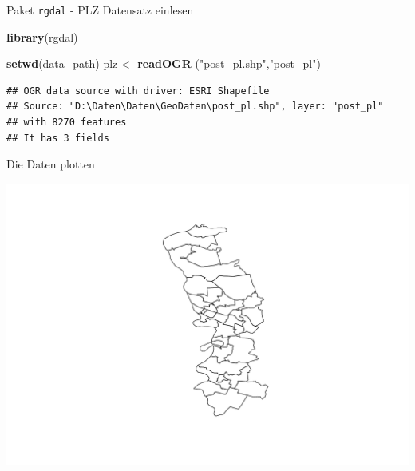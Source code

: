 \documentclass[ignorenonframetext,]{beamer}
\newenvironment{Shaded}{\begin{snugshade}}{\end{snugshade}}
\newcommand{\KeywordTok}[1]{\textcolor[rgb]{0.26,0.66,0.93}{\textbf{#1}}}
\newcommand{\DecValTok}[1]{\textcolor[rgb]{0.27,0.67,0.26}{#1}}
\newcommand{\StringTok}[1]{\textcolor[rgb]{0.02,0.61,0.04}{#1}}
\newcommand{\OperatorTok}[1]{\textcolor[rgb]{0.74,0.68,0.62}{#1}}
\newcommand{\NormalTok}[1]{\textcolor[rgb]{0.74,0.68,0.62}{#1}}
\begin{document}
\begin{frame}[fragile]{Paket \texttt{rgdal} - PLZ Datensatz einlesen}

\begin{Shaded}
\begin{Highlighting}[]
\KeywordTok{library}\NormalTok{(rgdal)}
\end{Highlighting}
\end{Shaded}

\begin{Shaded}
\begin{Highlighting}[]
\KeywordTok{setwd}\NormalTok{(data_path)}
\NormalTok{plz <-}\StringTok{ }\KeywordTok{readOGR}\NormalTok{ (}\StringTok{"post_pl.shp"}\NormalTok{,}\StringTok{"post_pl"}\NormalTok{)}
\end{Highlighting}
\end{Shaded}

\begin{verbatim}
## OGR data source with driver: ESRI Shapefile 
## Source: "D:\Daten\Daten\GeoDaten\post_pl.shp", layer: "post_pl"
## with 8270 features
## It has 3 fields
\end{verbatim}

\end{frame}

\begin{frame}[fragile]{Die Daten plotten}

\begin{Shaded}
\end{Shaded}

\includegraphics{Geomedizin_files/figure-beamer/unnamed-chunk-94-1.pdf}

\end{frame}
\end{document}
